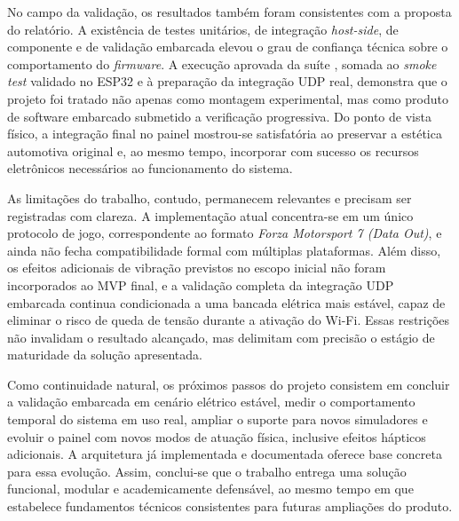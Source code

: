 \documentclass[
  12pt,
  oneside,
  a4paper,
  chapter=TITLE,
  section=TITLE,
  subsection=TITLE,
  brazil
]{abntex2}
\renewcommand{\texttt}[1]{\begingroup\ttfamily\seqsplit{#1}\endgroup}
\newcommand{\estrangeirismo}[1]{\textit{#1}}
\begin{document}
No campo da validação, os resultados também foram consistentes com a proposta do relatório. A existência de testes unitários, de integração \estrangeirismo{host-side}, de componente e de validação embarcada elevou o grau de confiança técnica sobre o comportamento do \estrangeirismo{firmware}. A execução aprovada da suíte \texttt{test\_native}, somada ao \estrangeirismo{smoke test} validado no ESP32 e à preparação da integração UDP real, demonstra que o projeto foi tratado não apenas como montagem experimental, mas como produto de software embarcado submetido a verificação progressiva. Do ponto de vista físico, a integração final no painel mostrou-se satisfatória ao preservar a estética automotiva original e, ao mesmo tempo, incorporar com sucesso os recursos eletrônicos necessários ao funcionamento do sistema.

As limitações do trabalho, contudo, permanecem relevantes e precisam ser registradas com clareza. A implementação atual concentra-se em um único protocolo de jogo, correspondente ao formato \estrangeirismo{Forza Motorsport 7 (Data Out)}, e ainda não fecha compatibilidade formal com múltiplas plataformas. Além disso, os efeitos adicionais de vibração previstos no escopo inicial não foram incorporados ao MVP final, e a validação completa da integração UDP embarcada continua condicionada a uma bancada elétrica mais estável, capaz de eliminar o risco de queda de tensão durante a ativação do Wi-Fi. Essas restrições não invalidam o resultado alcançado, mas delimitam com precisão o estágio de maturidade da solução apresentada.

Como continuidade natural, os próximos passos do projeto consistem em concluir a validação embarcada em cenário elétrico estável, medir o comportamento temporal do sistema em uso real, ampliar o suporte para novos simuladores e evoluir o painel com novos modos de atuação física, inclusive efeitos hápticos adicionais. A arquitetura já implementada e documentada oferece base concreta para essa evolução. Assim, conclui-se que o trabalho entrega uma solução funcional, modular e academicamente defensável, ao mesmo tempo em que estabelece fundamentos técnicos consistentes para futuras ampliações do produto.

\postextual
\end{document}
